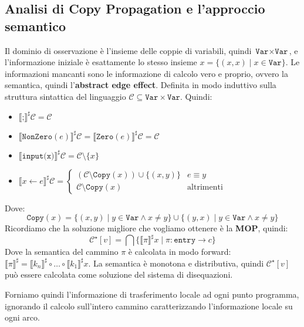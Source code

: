 \subsection{Analisi di Copy Propagation e l'approccio semantico}
Il dominio di osservazione è l'insieme delle coppie di variabili,
quindi $\texttt{Var} \times \texttt{Var}$, e l'informazione iniziale è esattamente lo stesso insieme
$x =\{(x,x) \mid x \in \texttt{Var}\}$.
Le informazioni mancanti sono le informazione di calcolo vero e proprio, ovvero la semantica, quindi 
l'\textbf{abstract edge effect}. Definita in modo induttivo sulla struttura sintattica del linguaggio 
$\mathcal{C} \subseteq \texttt{Var} \times \texttt{Var}$.
Quindi:
\begin{itemize}
    \item $\llbracket\texttt{;} \rrbracket^\sharp \mathcal{C} = \mathcal{C}$
    \item $\llbracket \texttt{NonZero}(e) \rrbracket^\sharp \mathcal{C} = 
    \llbracket \texttt{Zero}(e) \rrbracket^\sharp \mathcal{C}
    = \mathcal{C}$
    \item $\llbracket \texttt{input(x)} \rrbracket^\sharp \mathcal{C} =
    \mathcal{C} \setminus \{x\}$
    \item $\llbracket x \gets e \rrbracket^\sharp \mathcal{C} = 
    \begin{cases}
        (\mathcal{C} \setminus \texttt{Copy}(x)) \cup \{(x,y)\} & e \equiv y \\
        \mathcal{C} \setminus \texttt{Copy}(x) & \text{altrimenti}
    \end{cases}
    $
\end{itemize}
Dove:
\[
  \texttt{Copy}(x) = \{(x,y) \mid y \in \texttt{Var} \land x \not = y\} 
  \cup \{(y,x) \mid y \in \texttt{Var} \land x \not = y\}
\]
Ricordiamo che la soluzione migliore che vogliamo ottenere è la \textbf{MOP}, quindi:
\[
    \mathcal{C}^\star [v] = \bigcap  \{\llbracket \pi \rrbracket^\sharp x \mid \pi : \texttt{entry} \rightarrow c \}
\]
Dove la semantica del cammino $\pi$ è calcolata in modo forward: $\llbracket \pi \rrbracket^\sharp =
\llbracket k_n \rrbracket^\sharp \circ \dots \circ \llbracket k_1 \rrbracket^\sharp x$.
La semantica è monotona e distributiva, quindi $\mathcal{C}^\star [v]$ può essere calcolata come 
soluzione del sistema di disequazioni.

Forniamo quindi l'informazione di trasferimento locale ad ogni punto programma, ignorando il calcolo 
sull'intero cammino caratterizzando l'informazione locale su ogni arco.

